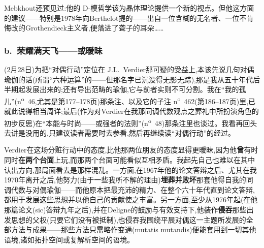 Mebkhout还预见过:他的 D-模哲学该为晶体理论提供一个新的视点。但他这方面的建议——特别是1978年向Berthelot提的——出自一位含糊的无名者、一位不肯悔改的Grothendieck主义者,便落进了聋子的耳朵……



\subsubsection*{b.~荣耀满天飞——或暧昧}



\dmark{}(2月28日)为把“对偶行动”定位在 J.L.~Verdier那可疑的受益上,本该先说几句对偶瑜伽的话(所谓“六种运算”的——但那名字已沉没得无影无踪),那是我从五十年代后半期起发展出来的;还有导出范畴的瑜伽,它与前者实则不可分割。我在“我的孤儿”(n\textsuperscript{o}~46,尤其是第177--178页)那条注、以及它的子注 n\textsuperscript{o}~462(第186--187页)里,已就此说得相当周详;最后(作为对Verdier在我那同调代数观点之葬礼中所扮演角色的初步反思)在“本能与时尚——或强者的法则”(n\textsuperscript{o}~48)那条注里也谈过。我看再回头去讲是没用的,只建议读者需要时去参看,然后再继续读“对偶行动”的经过。

Verdier在这场分赃行动中的态度,比他那两位朋友的态度显得更暧昧,因为他\textbf{曾}有时同时\textbf{在两个台面}上玩,而那两个台面可能看似互相矛盾。我起先自己也难以在其中认出方向,那局面看去是那样混乱。一方面,在1967年他的论文答辩之后、尤其在我1970年离开之后,他努力(由于一些我所不解的理由)\textbf{埋葬并败坏}那套他得自我的同调代数与对偶瑜伽——而他原本把最充沛的精力、在整个六十年代直到论文答辩,都用于发展这些思想并以他自己的贡献使之丰富。另一方面,至少从1976年起(在他那篇论文(sic)答辩九年之后),并在Deligne的鼓励与有效支持下,他装作\textbf{侵吞}那些出发思想的父权(只要它们没有被抵制),也侵吞\dmark{}我围绕平展对偶这一主题所发展的全部方法与成果——那些方法只需略作变通(mutatis mutandis)便能套用到一切其他语境,诸如拓扑空间或复解析空间的语境。


